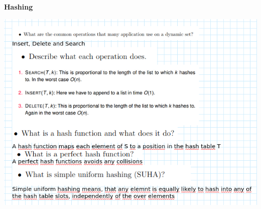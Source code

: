 \question \textbf{Hashing}

\begin{solution}
    \includegraphics[width=0.8\linewidth]{task_1/image.png}
\end{solution}
